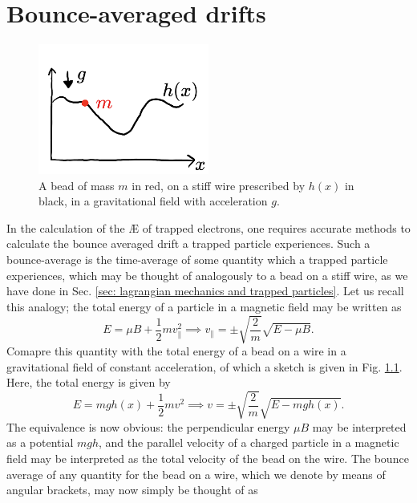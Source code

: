 \chapter[Bounce-averaged drifts]{Bounce-averaged drifts}
\label{chap: BAD}
\begin{figure}
    \centering
    \includegraphics[width=0.5\textwidth]{3_chapters/1_papers/BAD/figures/analogy.pdf}
    \caption{A bead of mass $m$ in red, on a stiff wire prescribed by $h(x)$ in black, in a gravitational field with acceleration $g$.}
    \label{fig:bead on a wire}
\end{figure}
In the calculation of the \AE{} of trapped electrons, one requires accurate methods to calculate the bounce averaged drift a trapped particle experiences. Such a bounce-average is the time-average of some quantity which a trapped particle experiences, which may be thought of analogously to a bead on a stiff wire, as we have done in Sec. \ref{sec: lagrangian mechanics and trapped particles}. Let us recall this analogy; the total energy of a particle in a magnetic field may be written as
\begin{equation}
    E = \mu B + \frac{1}{2}mv_\parallel^2 \implies v_\parallel = \pm \sqrt{\frac{2}{m}} \sqrt{E - \mu B}.
\end{equation}
Comapre this quantity with the total energy of a bead on a wire in a gravitational field of constant acceleration, of which a sketch is given in Fig. \ref{fig:bead on a wire}. Here, the total energy is given by
\begin{equation}
    E = mg h(x) + \frac{1}{2}mv^2 \implies v = \pm \sqrt{\frac{2}{m}} \sqrt{E - mgh(x)}.
\end{equation}
The equivalence is now obvious: the perpendicular energy $\mu B$ may be interpreted as a potential $mgh$, and the parallel velocity of a charged particle in a magnetic field may be interpreted as the total velocity of the bead on the wire. The bounce average of any quantity for the bead on a wire, which we denote by means of angular brackets, may now simply be thought of as
